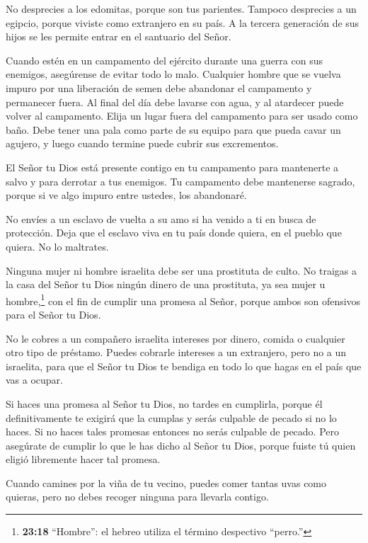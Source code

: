  No desprecies a los edomitas, porque son tus parientes.
Tampoco desprecies a un egipcio, porque viviste como extranjero en su
país.  A la tercera generación de sus hijos se les permite
entrar en el santuario del Señor.

 Cuando estén en un campamento del ejército durante una
guerra con sus enemigos, asegúrense de evitar todo lo malo.
 Cualquier hombre que se vuelva impuro por una liberación
de semen debe abandonar el campamento y permanecer fuera. 
Al final del día debe lavarse con agua, y al atardecer puede volver al
campamento.  Elija un lugar fuera del campamento para ser
usado como baño.  Debe tener una pala como parte de su
equipo para que pueda cavar un agujero, y luego cuando termine puede
cubrir sus excrementos.

 El Señor tu Dios está presente contigo en tu campamento
para mantenerte a salvo y para derrotar a tus enemigos. Tu campamento
debe mantenerse sagrado, porque si ve algo impuro entre ustedes, los
abandonaré.

 No envíes a un esclavo de vuelta a su amo si ha venido a
ti en busca de protección.  Deja que el esclavo viva en tu
país donde quiera, en el pueblo que quiera. No lo maltrates.

 Ninguna mujer ni hombre israelita debe ser una prostituta
de culto.  No traigas a la casa del Señor tu Dios ningún
dinero de una prostituta, ya sea mujer u hombre,\footnote{\textbf{23:18}
  ``Hombre'': el hebreo utiliza el término despectivo ``perro.''} con el
fin de cumplir una promesa al Señor, porque ambos son ofensivos para el
Señor tu Dios.

 No le cobres a un compañero israelita intereses por
dinero, comida o cualquier otro tipo de préstamo.  Puedes
cobrarle intereses a un extranjero, pero no a un israelita, para que el
Señor tu Dios te bendiga en todo lo que hagas en el país que vas a
ocupar.

 Si haces una promesa al Señor tu Dios, no tardes en
cumplirla, porque él definitivamente te exigirá que la cumplas y serás
culpable de pecado si no lo haces.  Si no haces tales
promesas entonces no serás culpable de pecado.  Pero
asegúrate de cumplir lo que le has dicho al Señor tu Dios, porque fuiste
tú quien eligió libremente hacer tal promesa.

 Cuando camines por la viña de tu vecino, puedes comer
tantas uvas como quieras, pero no debes recoger ninguna para llevarla
contigo.

